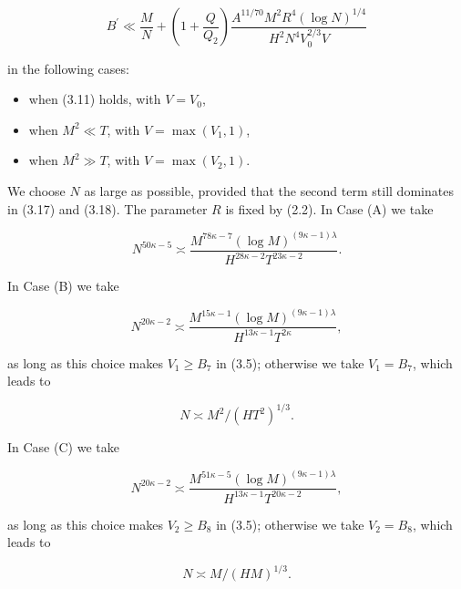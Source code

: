 \documentclass[10pt]{article}
\begin{document}
\begin{equation*}
B^{\prime} \ll \frac{M}{N}+\left(1+\frac{Q}{Q_{2}}\right) \frac{A^{11 / 70} M^{2} R^{4}(\log N)^{1 / 4}}{H^{2} N^{4} V_{0}^{2 / 3} V} \tag{3.18}
\end{equation*}


in the following cases:

\begin{itemize}
  \item[(A)] when (3.11) holds, with $V=V_{0}$,
  \item[(B)] when $M^{2} \ll T$, with $V=\max \left(V_{1}, 1\right)$,
  \item[(C)] when $M^{2} \gg T$, with $V=\max \left(V_{2}, 1\right)$.
\end{itemize}

We choose $N$ as large as possible, provided that the second term still dominates in (3.17) and (3.18). The parameter $R$ is fixed by (2.2). In Case (A) we take


\begin{equation*}
N^{50 \kappa-5} \asymp \frac{M^{78 \kappa-7}(\log M)^{(9 \kappa-1) \lambda}}{H^{28 \kappa-2} T^{23 \kappa-2}}. \tag{3.19}
\end{equation*}


In Case (B) we take


\begin{equation*}
N^{20 \kappa-2} \asymp \frac{M^{15 \kappa-1}(\log M)^{(9 \kappa-1) \lambda}}{H^{13 \kappa-1} T^{2 \kappa}}, \tag{3.20}
\end{equation*}


as long as this choice makes $V_{1} \geqslant B_{7}$ in (3.5); otherwise we take $V_{1}=B_{7}$, which leads to


\begin{equation*}
N \asymp M^{2} /\left(H T^{2}\right)^{1 / 3}. \tag{3.21}
\end{equation*}


In Case (C) we take


\begin{equation*}
N^{20 \kappa-2} \asymp \frac{M^{51 \kappa-5}(\log M)^{(9 \kappa-1) \lambda}}{H^{13 \kappa-1} T^{20 \kappa-2}}, \tag{3.22}
\end{equation*}


as long as this choice makes $V_{2} \geqslant B_{8}$ in (3.5); otherwise we take $V_{2}=B_{8}$, which leads to


\begin{equation*}
N \asymp M /(H M)^{1 / 3}. \tag{3.23}
\end{equation*}
\end{document}
